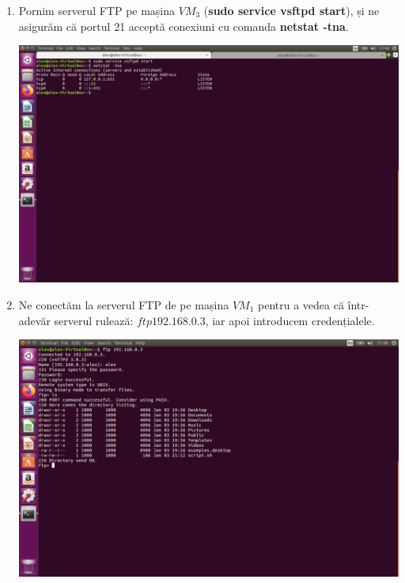 \documentclass[a4paper]{article}
\begin{document}
\begin{enumerate}
    \item Pornim serverul FTP pe mașina $ VM_3 $ (\textbf{sudo service vsftpd start}), și ne asigurăm că portul 21 acceptă conexiuni cu comanda \textbf{netstat -tna}.
    
    \begin{center}
        \hspace*{-1.8cm}                                           \includegraphics[scale=0.64]{"./img/pas1.png"}       
    \end{center}
    
    \item Ne conectăm la serverul FTP de pe mașina $ VM_1 $ pentru a vedea că într-adevăr serverul rulează: $ ftp 192.168.0.3 $, iar apoi introducem credențialele.
    
    \begin{center}
        \hspace*{-1.8cm}                                           \includegraphics[scale=0.64]{"./img/pas2.png"}       
    \end{center}
    

\end{enumerate}
\end{document}
